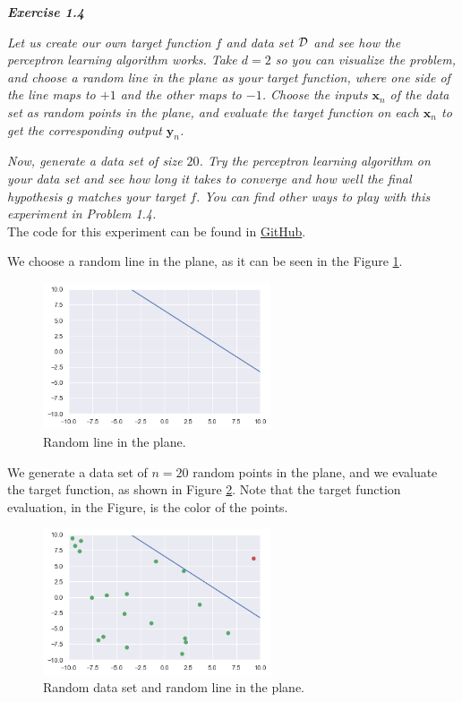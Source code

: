 \documentclass{article}
\begin{document}
    \noindent \textbf{\textit{Exercise 1.4}}

    \noindent \textit{Let us create our own target function $f$ and data set $\cal{D}$ and see how the perceptron learning algorithm works.
    Take $d = 2$ so you can visualize the problem, and choose a random line in the plane as your target function, where one side of the line maps to $+1$ and the other maps to $-1$.
    Choose the inputs $\mathbf{x}_n$ of the data set as random points in the plane, and evaluate the target function on each $\mathbf{x}_n$ to get the corresponding output $\mathbf{y}_n$.}

    \noindent\textit{Now, generate a data set of size $20$. Try the perceptron learning algorithm on your data set and see how long it takes to converge and how well the final hypothesis $g$ matches your target $f$.
    You can find other ways to play with this experiment in Problem 1.4.} \\

    The code for this experiment can be found in \href{https://github.com/lucasresck/machine-learning/blob/main/notebooks/exercise_1.4.ipynb}{GitHub}.

    We choose a random line in the plane, as it can be seen in the Figure \ref{fig:random_line}.
    
    \begin{figure}[H]
        \centering
        \includegraphics[width=0.6\textwidth]{exercise_1.4_1.png}
        \caption{Random line in the plane.}
        \label{fig:random_line}
    \end{figure}

    We generate a data set of $n = 20$ random points in the plane, and we evaluate the target function, as shown in Figure \ref{fig:data_set}.
    Note that the target function evaluation, in the Figure, is the color of the points.
    
    \begin{figure}[H]
        \centering
        \includegraphics[width=0.6\textwidth]{exercise_1.4_2.png}
        \caption{Random data set and random line in the plane.}
        \label{fig:data_set}
    \end{figure}
\end{document}
